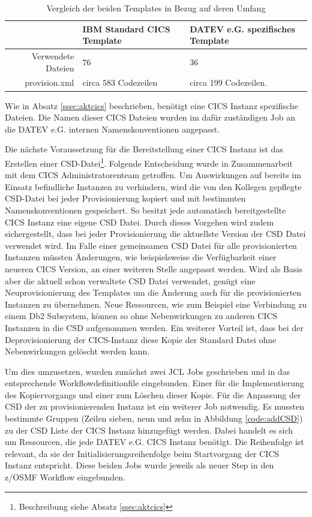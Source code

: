\begin{table}[h]
\centering
\begin{tabularx}{\textwidth}{r|X|X}
& IBM Standard CICS Template & DATEV e.G. spezifisches Template \\
\hline
Verwendete Dateien & 76 & 36 \\
\hline
provision.xml & circa 583 Codezeilen & circa 199 Codezeilen. \\
\end{tabularx}
\caption{Vergleich der beiden Templates in Bezug auf deren Umfang}
\label{tab:vglTemps}
\end{table}

Wie in Absatz \ref{ssec:aktcics} beschrieben, benötigt eine CICS Instanz spezifische Dateien.
Die Namen dieser CICS Dateien wurden im dafür zuständigen Job an die DATEV e.G. internen Namenskonventionen angepasst.

Die nächste Voraussetzung für die Bereitstellung einer CICS Instanz ist das Erstellen einer CSD-Datei\footnote{Beschreibung siehe Absatz \ref{ssec:aktcics}}.
Folgende Entscheidung wurde in Zusammenarbeit mit dem CICS Administratorenteam getroffen.
Um Auswirkungen auf bereits im Einsatz befindliche Instanzen zu verhindern, wird die von den Kollegen gepflegte CSD-Datei bei jeder Provisionierung kopiert und mit bestimmten Namenskonventionen gespeichert.
So besitzt jede automatisch bereitgestellte CICS Instanz eine eigene CSD Datei.
Durch dieses Vorgehen wird zudem sichergestellt, dass bei jeder Provisionierung die aktuellste Version der CSD Datei verwendet wird.
Im Falle einer gemeinsamen CSD Datei für alle provisionierten Instanzen müssten Änderungen, wie beispielsweise die Verfügbarkeit einer neueren CICS Version, an einer weiteren Stelle angepasst werden.
Wird als Basis aber die aktuell schon verwaltete CSD Datei verwendet, genügt eine Neuprovisionierung des Templates um die Änderung auch für die provisionierten Instanzen zu übernehmen.
Neue Ressourcen, wie zum Beispiel eine Verbindung zu einem Db2 Subsystem, können so ohne Nebenwirkungen zu anderen CICS Instanzen in die CSD aufgenommen werden.
Ein weiterer Vorteil ist, dass bei der Deprovisionierung der CICS-Instanz diese Kopie der Standard Datei ohne Nebenwirkungen gelöscht werden kann.

Um dies umzusetzen, wurden zunächst zwei JCL Jobs geschrieben und in das entsprechende Workflowdefinitionfile eingebunden.
Einer für die Implementierung des Kopiervorgangs und einer zum Löschen dieser Kopie.
Für die Anpassung der CSD der zu provisionierenden Instanz ist ein weiterer Job notwendig.
Es mussten bestimmte Gruppen (Zeilen sieben, neun und zehn in Abbildung \ref{code:addCSD}) zu der CSD Liste der CICS Instanz hinzugefügt werden.
Dabei handelt es sich um Ressourcen, die jede DATEV e.G. CICS Instanz benötigt.
Die Reihenfolge ist relevant, da sie der Initialisierungsreihenfolge beim Startvorgang der CICS Instanz entspricht.
Diese beiden Jobs wurde jeweils als neuer Step in den z/OSMF Workflow eingebunden.

